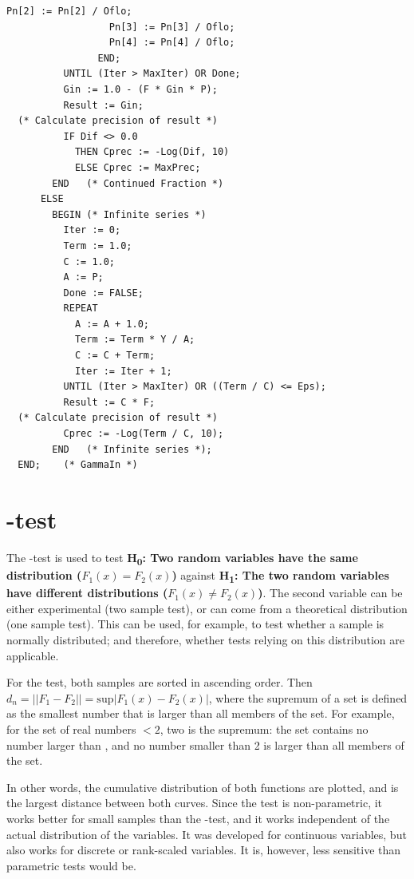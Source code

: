 \begin{refsection}
\begin{lstlisting}[caption=\textgamma distribution]
                  Pn[2] := Pn[2] / Oflo;
                  Pn[3] := Pn[3] / Oflo;
                  Pn[4] := Pn[4] / Oflo;
                END;
          UNTIL (Iter > MaxIter) OR Done;
          Gin := 1.0 - (F * Gin * P);
          Result := Gin;
  (* Calculate precision of result *)
          IF Dif <> 0.0
            THEN Cprec := -Log(Dif, 10)
            ELSE Cprec := MaxPrec;
        END   (* Continued Fraction *)
      ELSE
        BEGIN (* Infinite series *)
          Iter := 0;
          Term := 1.0;
          C := 1.0;
          A := P;
          Done := FALSE;
          REPEAT
            A := A + 1.0;
            Term := Term * Y / A;
            C := C + Term;
            Iter := Iter + 1;
          UNTIL (Iter > MaxIter) OR ((Term / C) <= Eps);
          Result := C * F;
  (* Calculate precision of result *)
          Cprec := -Log(Term / C, 10);
        END   (* Infinite series *);
  END;    (* GammaIn *)
\end{lstlisting}

\section{-test}

The -test is used to test \textbf{H\textsubscript{0}: Two random variables have the same distribution (\( F_1(x) = F_2(x) \))} against \textbf{H\textsubscript{1}: The two random variables have different distributions (\( F_1(x) \neq F_2(x) \))}. The second variable can be either experimental (two sample test), or can come from a theoretical distribution (one sample test). This can be used, for example, to test whether a sample is normally distributed; and therefore, whether tests relying on this distribution are applicable.

For the test, both samples are sorted in ascending order. Then \( d_n = ||F_1 - F_2|| = \mathrm{sup}|F_1(x) - F_2(x)| \), where the supremum of a set is defined as the smallest number that is larger than all members of the set. For example, for the set of real numbers \(< 2\), two is the supremum: the set contains no number larger than , and no number smaller than \num{2} is larger than all members of the set.

In other words, the cumulative distribution of both functions are plotted, and  is the largest distance between both curves. Since the test is non-parametric, it works better for small samples than the -test, and it works independent of the actual distribution of the variables. It was developed for continuous variables, but also works for discrete or rank-scaled variables. It is, however, less sensitive than parametric tests would be. 


\end{refsection}
